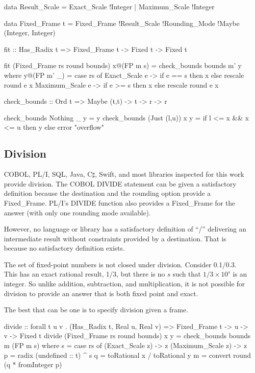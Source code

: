 \documentclass{article}
\begin{document}
\begin{code}
data Result_Scale
   = Exact_Scale   !Integer
   | Maximum_Scale !Integer

data Fixed_Frame t
   = Fixed_Frame !Result_Scale !Rounding_Mode
                 !Maybe (Integer, Integer)

fit :: Has_Radix t =>
       Fixed_Frame t -> Fixed t -> Fixed t

fit (Fixed_Frame rs round bounds) x@(FP m s)
  = check_bounds bounds m' y
  where
    y@(FP m' _) =
      case rs of
        Exact_Scale e   -> if e == s then x else
                           rescale round e x
        Maximum_Scale e -> if e >= s then x else
                           rescale round e x

check_bounds :: Ord t => Maybe (t,t) -> t -> r -> r

check_bounds Nothing      _ y = y
check_bounds (Just (l,u)) x y =
  if l <= x && x <= u then y else error "overflow"

\end{code}

\subsection{Division}

COBOL, PL/I, SQL, Java, C$\sharp$, Swift, and most libraries
inspected for this work provide division.  The COBOL
DIVIDE statement can be given a satisfactory definition because
the destination and the rounding option provide a Fixed\_Frame.
PL/I's DIVIDE function also provides a Fixed\_Frame for the
answer (with only one rounding mode available).

However, no language or library has a satisfactory definition of
``/'' delivering an intermediate result without constraints
provided by a destination.  That is because no satisfactory
definition exists.

The set of fixed-point numbers is not closed under division.
Consider 0.1/0.3.  This has an exact rational result, 1/3,
but there is no $s$ such that $1/3 \times 10^s$ is an integer.
So unlike addition, subtraction, and multiplication, it is not
possible for division to provide an answer that is both fixed
point and exact.

The best that can be one is to specify division given a frame.

\begin{code}
divide :: forall t u v . (Has_Radix t, Real u, Real v) =>
          Fixed_Frame t -> u -> v -> Fixed t
divide (Fixed_Frame rs round bounds) x y
  = check_bounds bounds m (FP m s)
  where
    s = case rs of
          (Exact_Scale   z) -> z
          (Maximum_Scale z) -> z
    p = radix (undefined :: t) ^ s
    q = toRational x / toRational y
    m = convert round (q * fromInteger p)
\end{code}
\end{document}
